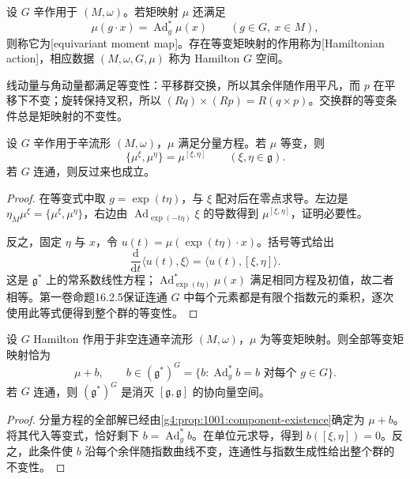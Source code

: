 \begin{definition}\label{g4:def:1001:equivariant}
	设 \(G\) 辛作用于 \((M,\omega)\)。若矩映射 \(\mu\) 还满足
	\begin{equation}\label{g4:eq:1001:equivariance}
		\mu(g\cdot x)=\operatorname{Ad}_g^*\mu(x)
		\qquad(g\in G,\ x\in M),
	\end{equation}
	则称它为[equivariant moment map]。存在等变矩映射的作用称为[Hamiltonian action]，相应数据 \((M,\omega,G,\mu)\) 称为 Hamilton \(G\) 空间。
\end{definition}

线动量与角动量都满足等变性：平移群交换，所以其余伴随作用平凡，而 \(p\) 在平移下不变；旋转保持叉积，所以 \((Rq)\times(Rp)=R(q\times p)\)。交换群的等变条件总是矩映射的不变性。\cite[定义5.16及其例，第154--155页]{Cannas2006Symplectic}

\begin{proposition}\label{g4:prop:1001:equivariance-bracket}
	设 \(G\) 辛作用于辛流形 \((M,\omega)\)，\(\mu\) 满足分量方程。若 \(\mu\) 等变，则
	\begin{equation}\label{g4:eq:1001:infinitesimal-equivariance}
		\{\mu^\xi,\mu^\eta\}=\mu^{[\xi,\eta]}
		\qquad(\xi,\eta\in\mathfrak g).
	\end{equation}
	若 \(G\) 连通，则反过来也成立。
\end{proposition}
\begin{proof}
	在等变式中取 \(g=\exp(t\eta)\)，与 \(\xi\) 配对后在零点求导。左边是 \(\eta_M\mu^\xi=\{\mu^\xi,\mu^\eta\}\)，右边由 \(\operatorname{Ad}_{\exp(-t\eta)}\xi\) 的导数得到 \(\mu^{[\xi,\eta]}\)，证明必要性。

	反之，固定 \(\eta\) 与 \(x\)，令 \(u(t)=\mu(\exp(t\eta)\cdot x)\)。括号等式给出
	\[
		\frac{\mathrm{d}}{\mathrm{d}t}\langle u(t),\xi\rangle
		=\langle u(t),[\xi,\eta]\rangle.
	\]
	这是 \(\mathfrak g^*\) 上的常系数线性方程；\(\operatorname{Ad}_{\exp(t\eta)}^*\mu(x)\) 满足相同方程及初值，故二者相等。第一卷命题16.2.5保证连通 \(G\) 中每个元素都是有限个指数元的乘积，逐次使用此等式便得到整个群的等变性。
\end{proof}

\begin{proposition}\label{g4:prop:1001:constant-freedom}
	设 \(G\) Hamilton 作用于非空连通辛流形 \((M,\omega)\)，\(\mu\) 为等变矩映射。则全部等变矩映射恰为
	\[
		\mu+b,\qquad b\in(\mathfrak g^*)^G
		=\{b:\operatorname{Ad}_g^*b=b\text{ 对每个 }g\in G\}.
	\]
	若 \(G\) 连通，则 \((\mathfrak g^*)^G\) 是消灭 \([\mathfrak g,\mathfrak g]\) 的协向量空间。
\end{proposition}
\begin{proof}
	分量方程的全部解已经由\cref{g4:prop:1001:component-existence}确定为 \(\mu+b\)。将其代入等变式，恰好剩下 \(b=\operatorname{Ad}_g^*b\)。在单位元求导，得到 \(b([\xi,\eta])=0\)。反之，此条件使 \(b\) 沿每个余伴随指数曲线不变，连通性与指数生成性给出整个群的不变性。
\end{proof}

